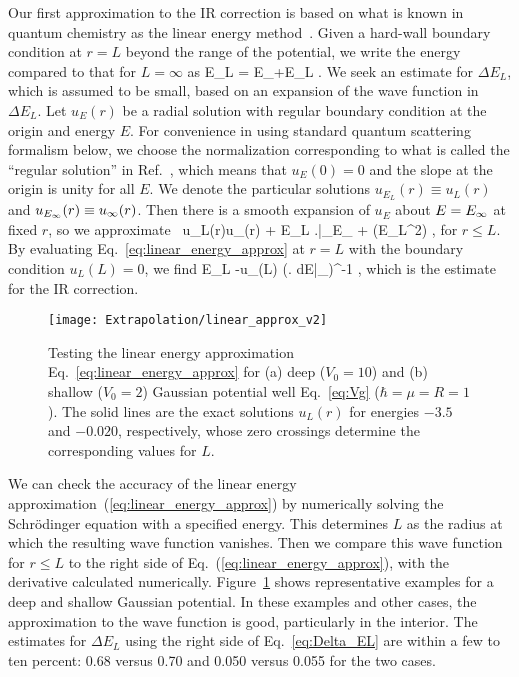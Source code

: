 	Our first approximation to the IR correction
	is based on what is known in quantum chemistry
	as the linear energy method~\cite{Djajaputra:2000aa}.  Given a
	hard-wall boundary condition at $r=L$ beyond the range of the
	potential, we write the energy compared to that for $L=\infty$ as
	\beq
	 E_L = E_{\infty}+\Delta E_L
	 \;.
	\eeq
	We seek an estimate for $\Delta E_L$, which is assumed to be small,
	based on an expansion of the wave function in $\Delta E_L$.  Let
	$u_E(r)$ be a radial solution with regular boundary condition at the
	origin and energy $E$.  For convenience in using standard quantum
	scattering formalism below, we choose the normalization corresponding
	to what is called the ``regular solution'' in
	Ref.~\cite{taylor2006scattering}, which means that $u_E(0) = 0$ and
	the slope at the origin is unity for all $E$.  We denote the
	particular solutions $u_{E_L}(r)\equiv u_L(r)$ and $u_{E_{\infty}}(r)
	\equiv u_\infty (r)$. Then there is a smooth expansion of $u_E$ about
	$E=E_{\infty}$ at fixed $r$, so we approximate~\cite{Djajaputra:2000aa}
	\beq
	  u_L(r)\approx u_\infty (r) + \Delta E_L
	  \left.\right|_{E_{\infty}}
	  + (\Delta E_L^2) \;,
	  \label{eq:linear_energy_approx}
	\eeq
	for $r\leq L$.
	By evaluating Eq.~\eqref{eq:linear_energy_approx} at $r=L$ with the
	boundary condition $u_L(L)=0$, we find
	\beq
	  \Delta E_L \approx -u_\infty(L) \left(\left.
	  {dE}\right|_{\Einf}\right)^{-1}
	  \;,
	  \label{eq:Delta_EL}
	\eeq
	which is the estimate for the IR correction.

	\begin{figure}[h]
	\centering
	\texttt{[image: Extrapolation/linear\_approx\_v2]}
	\caption{Testing the linear energy approximation
	  Eq.~\eqref{eq:linear_energy_approx} for (a) deep ($V_0=10$) and (b)
	  shallow ($V_0=2$) Gaussian potential well Eq.~\eqref{eq:Vg}
		($\hbar = \mu = R=1$).
	  The solid lines are the exact solutions $u_L(r)$ for energies $-3.5$
	  and $-0.020$, respectively, whose zero crossings determine the
	  corresponding values for $L$.}
	\label{fig:linear_energy_approx}
	\end{figure}

	We can check the accuracy of the linear energy
	approximation~(\ref{eq:linear_energy_approx}) by numerically solving
	the Schr\"odinger equation with a specified energy.  This determines
	$L$ as the radius at which the resulting wave function vanishes. Then
	we compare this wave function for $r \leq L$ to the right side of
	Eq.~(\ref{eq:linear_energy_approx}), with the derivative calculated
	numerically.  Figure~\ref{fig:linear_energy_approx} shows
	representative examples for a deep and shallow Gaussian potential.  In
	these examples and other cases, the approximation to the wave function
	is good, particularly in the interior.  The estimates for $\Delta E_L$
	using the right side of Eq.~\eqref{eq:Delta_EL} are within a few to
	ten percent: 0.68 versus 0.70 and 0.050 versus 0.055 for the two
	cases.

